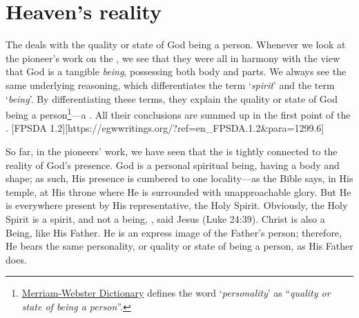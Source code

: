 \chapter{Heaven's reality}

The  deals with the quality or state of God being a person. Whenever we look at the pioneer's work on the , we see that they were all in harmony with the view that God is a tangible \textit{being}, possessing both body and parts. We always see the same underlying reasoning, which differentiates the term ‘\textit{spirit}’ and the term ‘\textit{being}’. By differentiating these terms, they explain the quality or state of God being a person\footnote{\href{https://www.merriam-webster.com/dictionary/personality}{Merriam-Webster Dictionary} defines the word ‘\textit{personality}’ as “\textit{quality or state of being a person}”.}—a . All their conclusions are summed up in the first point of the . [FPSDA 1.2][https://egwwritings.org/?ref=en\_FPSDA.1.2&para=1299.6]

So far, in the pioneers’ work, we have seen that the  is tightly connected to the reality of God’s presence. God is a personal spiritual being, having a body and shape; as such, His presence is cumbered to one locality—as the Bible says, in His temple, at His throne where He is surrounded with unapproachable glory. But He is everywhere present by His representative, the Holy Spirit. Obviously, the Holy Spirit is a spirit, and not a being, , said Jesus (Luke 24:39). Christ is also a Being, like His Father. He is an express image of the Father’s person; therefore, He bears the same personality, or quality or state of being a person, as His Father does.

